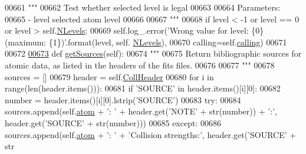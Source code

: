 \begin{DoxyCode}
{{00661         \textcolor{stringliteral}{"""}
00662 \textcolor{stringliteral}{        Test whether selected level is legal}
00663 \textcolor{stringliteral}{}
00664 \textcolor{stringliteral}{        Parameters:}
00665 \textcolor{stringliteral}{            - level        selected atom level}
00666 \textcolor{stringliteral}{}
00667 \textcolor{stringliteral}{        """}       
00668         \textcolor{keywordflow}{if} level < -1 \textcolor{keywordflow}{or} level == 0 \textcolor{keywordflow}{or} level > self.\hyperlink{classpyneb_1_1core_1_1pynebcore_1_1___coll_data_fits_a64b97a86b4dfb53e4cba3ce8ac0fdf00}{NLevels}:
00669             self.log\_.error(\textcolor{stringliteral}{'Wrong value for level: \{0\} (maximum: \{1\})'}.format(level, self.
      \hyperlink{classpyneb_1_1core_1_1pynebcore_1_1___coll_data_fits_a64b97a86b4dfb53e4cba3ce8ac0fdf00}{NLevels}),
00670                             calling=self.\hyperlink{classpyneb_1_1core_1_1pynebcore_1_1___coll_data_fits_a43c9d096f9508cb475cb4fc3552e1979}{calling})
00671         
00672         
\hypertarget{pynebcore_8py_source_l00673}{}\hyperlink{classpyneb_1_1core_1_1pynebcore_1_1___coll_data_fits_a13ff2c1aef93336f152a248e534bd104}{00673}     \textcolor{keyword}{def }\hyperlink{classpyneb_1_1core_1_1pynebcore_1_1___coll_data_fits_a13ff2c1aef93336f152a248e534bd104}{getSources}(self):
00674         \textcolor{stringliteral}{"""}
00675 \textcolor{stringliteral}{        Return bibliographic sources for atomic data, as listed in the headers of the fits files.}
00676 \textcolor{stringliteral}{}
00677 \textcolor{stringliteral}{        """}
00678         sources = []
00679         header = self.\hyperlink{classpyneb_1_1core_1_1pynebcore_1_1___coll_data_fits_ac869d4a1a70ad7d42881b0e19a69ab4c}{CollHeader}
00680         \textcolor{keywordflow}{for} i \textcolor{keywordflow}{in} range(len(header.items())):
00681             \textcolor{keywordflow}{if} \textcolor{stringliteral}{'SOURCE'} \textcolor{keywordflow}{in} header.items()[i][0]:
00682                 number = header.items()[i][0].lstrip(\textcolor{stringliteral}{'SOURCE'})
00683                 \textcolor{keywordflow}{try}:
00684                     sources.append(self.\hyperlink{classpyneb_1_1core_1_1pynebcore_1_1___coll_data_fits_a8bbd2e846954f94878e90ebdf0e51772}{atom} + \textcolor{stringliteral}{': '} + header.get(\textcolor{stringliteral}{'NOTE'} + str(number)) + \textcolor{stringliteral}{':'}, 
      header.get(\textcolor{stringliteral}{'SOURCE'} + str(number)))
00685                 \textcolor{keywordflow}{except}:
00686                     sources.append(self.\hyperlink{classpyneb_1_1core_1_1pynebcore_1_1___coll_data_fits_a8bbd2e846954f94878e90ebdf0e51772}{atom} + \textcolor{stringliteral}{': '} + \textcolor{stringliteral}{'Collision strengths:'}, header.get(\textcolor{stringliteral}{'SOURCE'} + str
}}
\end{DoxyCode}
